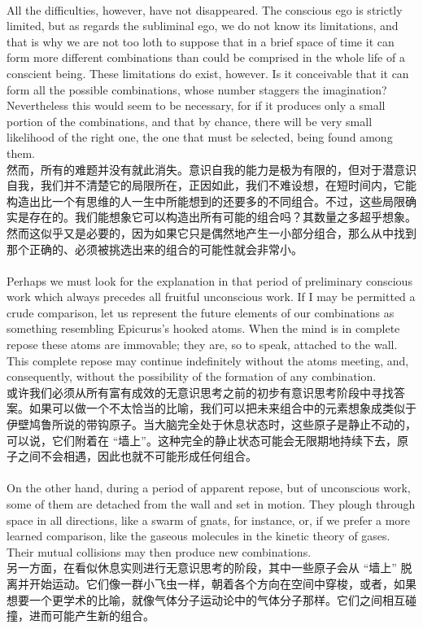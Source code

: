 \documentclass{article}
\begin{document}
\\
All the difficulties, however, have not disappeared. The conscious ego is strictly limited, but as regards the subliminal ego, we do not know its limitations, and that is why we are not too loth to suppose that in a brief space of time it can form more different combinations than could be comprised in the whole life of a conscient being. These limitations do exist, however. Is it conceivable that it can form all the possible combinations, whose number staggers the imagination? Nevertheless this would seem to be necessary, for if it produces only a small portion of the combinations, and that by chance, there will be very small likelihood of the right one, the one that must be selected, being found among them.\\
然而，所有的难题并没有就此消失。意识自我的能力是极为有限的，但对于潜意识自我，我们并不清楚它的局限所在，正因如此，我们不难设想，在短时间内，它能构造出比一个有思维的人一生中所能想到的还要多的不同组合。不过，这些局限确实是存在的。我们能想象它可以构造出所有可能的组合吗？其数量之多超乎想象。然而这似乎又是必要的，因为如果它只是偶然地产生一小部分组合，那么从中找到那个正确的、必须被挑选出来的组合的可能性就会非常小。 \\ 

\\
Perhaps we must look for the explanation in that period of preliminary conscious work which always precedes all fruitful unconscious work. If I may be permitted a crude comparison, let us represent the future elements of our combinations as something resembling Epicurus’s hooked atoms. When the mind is in complete repose these atoms are immovable; they are, so to speak, attached to the wall. This complete repose may continue indefinitely without the atoms meeting, and, consequently, without the possibility of the formation of any combination. \\
或许我们必须从所有富有成效的无意识思考之前的初步有意识思考阶段中寻找答案。如果可以做一个不太恰当的比喻，我们可以把未来组合中的元素想象成类似于伊壁鸠鲁所说的带钩原子。当大脑完全处于休息状态时，这些原子是静止不动的，可以说，它们附着在 “墙上”。这种完全的静止状态可能会无限期地持续下去，原子之间不会相遇，因此也就不可能形成任何组合。 \\ 

\\
On the other hand, during a period of apparent repose, but of unconscious work, some of them are detached from the wall and set in motion. They plough through space in all directions, like a swarm of gnats, for instance, or, if we prefer a more learned comparison, like the gaseous molecules in the kinetic theory of gases. Their mutual collisions may then produce new combinations.\\
另一方面，在看似休息实则进行无意识思考的阶段，其中一些原子会从 “墙上” 脱离并开始运动。它们像一群小飞虫一样，朝着各个方向在空间中穿梭，或者，如果想要一个更学术的比喻，就像气体分子运动论中的气体分子那样。它们之间相互碰撞，进而可能产生新的组合。 \\
\end{document}
